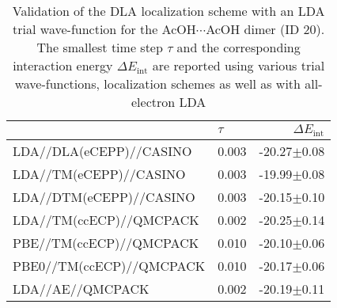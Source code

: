 \begin{table}
\caption{\label{tab:acetic_acid_validation}Validation of the DLA localization scheme with an LDA trial wave-function for the AcOH$\cdots$AcOH dimer (ID 20). The smallest time step $\tau$ and the corresponding interaction energy $\Delta E_\text{int}$ are reported using various trial wave-functions, localization schemes as well as with all-electron LDA}
\begin{adjustbox}{center}
\begin{tabular}{llr}
\toprule
 & $\tau$ & $\Delta E_\text{int}$ \\ 
\midrule
LDA//DLA(eCEPP)//CASINO & 0.003 & -20.27$\pm$0.08 \\
LDA//TM(eCEPP)//CASINO & 0.003 & -19.99$\pm$0.08 \\
LDA//DTM(eCEPP)//CASINO & 0.003 & -20.15$\pm$0.10 \\
LDA//TM(ccECP)//QMCPACK & 0.002 & -20.25$\pm$0.14 \\
PBE//TM(ccECP)//QMCPACK & 0.010 & -20.10$\pm$0.06 \\
PBE0//TM(ccECP)//QMCPACK & 0.010 & -20.17$\pm$0.06 \\
LDA//AE//QMCPACK & 0.002 & -20.19$\pm$0.11 \\
\bottomrule
\end{tabular}
\end{adjustbox}
\end{table}